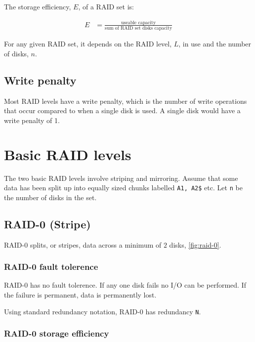 The storage efficiency, $E$, of a RAID set is:

\begin{align}
  E & = \frac{\mbox{useable capacity}}{\mbox{sum of RAID set disks capacity}} \label{eq:raid-storage-efficiency}
\end{align}

For any given RAID set, it depends on the RAID level, $L$, in use
and the number of disks, $n$.

\subsection{Write penalty}
\label{sec:write-penalty}

Most RAID levels have a write penalty, which is the number of write
operations that occur compared to when a single disk is used. A single
disk would have a write penalty of 1.

\section{Basic RAID levels}
\label{sec:basic-raid-levels}

The two basic RAID levels involve striping and mirroring. Assume that
some data has been split up into equally sized chunks labelled
\texttt{A1,\ A2\$} etc. Let \texttt{n} be the number of disks in the
set.

\subsection{RAID-0 (Stripe)}
\label{sec:raid-0-stripe}

RAID-0 splits, or stripes, data across a minimum of $2$ disks, \autoref{fig:raid-0}.



\subsubsection{RAID-0 fault tolerence}
\label{sec:raid-0-fault-tolerence}

RAID-0 has no fault tolerence. If any one disk fails no I/O can be
performed. If the failure is permanent, data is permanently lost.

Using standard redundancy notation, RAID-0 has redundancy \texttt{N}.

\subsubsection{RAID-0 storage efficiency}
\label{sec:raid-0-storage-efficiency}

